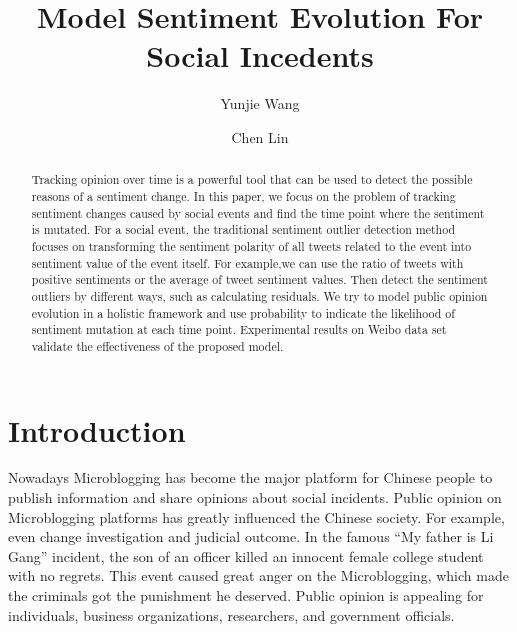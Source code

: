 \documentclass[runningheads]{llncs}
\begin{document}
\title{Model Sentiment Evolution For Social Incedents}
\author{Yunjie Wang \and Chen Lin}



\maketitle             

\begin{abstract}
Tracking opinion over time is a powerful tool that can be used to detect the possible reasons of a sentiment change. In this paper, we focus on the problem of tracking sentiment changes caused by social events and find the time point where the sentiment is mutated. For a social event, the traditional sentiment outlier detection method focuses on transforming the sentiment polarity of all tweets related to the event into sentiment value of the event itself. For example,we can use the ratio of tweets with positive sentiments or the average of tweet sentiment values. Then detect the sentiment outliers by different ways, such as calculating residuals. We try to model public opinion evolution in a holistic framework and use probability to indicate the likelihood of sentiment mutation at each time point. Experimental results on  Weibo data set validate the effectiveness of the proposed model.


\end{abstract}
%
%
%
\section{Introduction}
Nowadays Microblogging has become the major platform for Chinese people to publish information and share opinions about social incidents. Public opinion on Microblogging platforms has greatly influenced the Chinese society. For example, even change investigation and judicial outcome. In the famous ``My father is Li Gang'' incident, the son of an officer killed an innocent female college student with no regrets. This event caused great anger on the Microblogging, which made the criminals got the punishment he deserved. Public opinion is appealing for individuals, business organizations, researchers, and government officials.%
\end{document}
